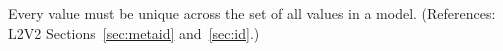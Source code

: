 Every   value must be unique across the set of all
 values in a model.  (References: L2V2
Sections~\ref{sec:metaid} and~\ref{sec:id}.)
